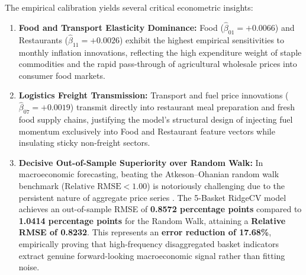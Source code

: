 \hs The empirical calibration yields several critical econometric insights:
\begin{enumerate}
    \item \textbf{Food and Transport Elasticity Dominance:} Food ($\hat{\beta}_{01} = +0.0066$) and Restaurants ($\hat{\beta}_{11} = +0.0026$) exhibit the highest empirical sensitivities to monthly inflation innovations, reflecting the high expenditure weight of staple commodities and the rapid pass-through of agricultural wholesale prices into consumer food markets.
    \item \textbf{Logistics Freight Transmission:} Transport and fuel price innovations ($\hat{\beta}_{07} = +0.0019$) transmit directly into restaurant meal preparation and fresh food supply chains, justifying the model's structural design of injecting fuel momentum exclusively into Food and Restaurant feature vectors while insulating sticky non-freight sectors.
    \item \textbf{Decisive Out-of-Sample Superiority over Random Walk:} In macroeconomic forecasting, beating the Atkeson--Ohanian random walk benchmark ($\text{Relative RMSE} < 1.00$) is notoriously challenging due to the persistent nature of aggregate price series \citep{atkeson2001phillips, babii2022machine}. The 5-Basket RidgeCV model achieves an out-of-sample RMSE of \textbf{0.8572 percentage points} compared to \textbf{1.0414 percentage points} for the Random Walk, attaining a \textbf{Relative RMSE of 0.8232}. This represents an \textbf{error reduction of 17.68\%}, empirically proving that high-frequency disaggregated basket indicators extract genuine forward-looking macroeconomic signal rather than fitting noise.
\end{enumerate}

